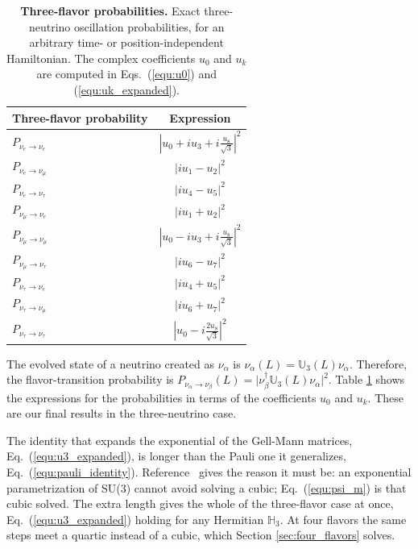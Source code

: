 \documentclass[final,5p,times,twocolumn,sort,compress]{elsarticle}
\newcommand{\eq}{Eq.}
\newcommand{\equ}[1]{\eq~(\ref{equ:#1})}
\begin{document}
{\def\arraystretch{1.3}
\begin{table}[t!]
 \begin{tabular}{lc}
  Three-flavor probability & Expression \\
  \hline
  $P_{\nu_e \to \nu_e}$        & $\left\vert u_0 + i u_3 + i \frac{u_8}{\sqrt{3}} \right\vert^2$ \\
  $P_{\nu_e \to \nu_\mu}$      & $\left\vert i u_1 - u_2 \right\vert^2$ \\
  $P_{\nu_e \to \nu_\tau}$     & $\left\vert i u_4 - u_5 \right\vert^2$ \\
  $P_{\nu_\mu \to \nu_e}$      & $\left\vert i u_1 + u_2 \right\vert^2$ \\
  $P_{\nu_\mu \to \nu_\mu}$    & $\left\vert u_0 - i u_3 + i \frac{u_8}{\sqrt{3}} \right\vert^2$ \\
  $P_{\nu_\mu \to \nu_\tau}$   & $\left\vert i u_6 - u_7 \right\vert^2$ \\
  $P_{\nu_\tau \to \nu_e}$     & $\left\vert i u_4 + u_5 \right\vert^2$ \\
  $P_{\nu_\tau \to \nu_\mu}$   & $\left\vert i u_6 + u_7 \right\vert^2$ \\
  $P_{\nu_\tau \to \nu_\tau}$  & $\left\vert u_0 - i \frac{2 u_8}{\sqrt{3}} \right\vert^2$ \\
 \end{tabular}
 \caption{\label{tab:prob_3nu}{\bf Three-flavor probabilities.} Exact three-neutrino oscillation probabilities, for an arbitrary time- or position-independent Hamiltonian.  The complex coefficients $u_0$ and $u_k$ are computed in Eqs.\ (\ref{equ:u0}) and (\ref{equ:uk_expanded}).}
\end{table}
}

The evolved state of a neutrino created as $\nu_\alpha$ is $\nu_\alpha(L) = \mathbb{U}_3(L) \nu_\alpha$.  Therefore, the flavor-transition probability is $P_{\nu_\alpha \to \nu_\beta}(L) = \lvert \nu_\beta^\dagger \mathbb{U}_3(L) \nu_\alpha \rvert^2$.   Table \ref{tab:prob_3nu} shows the expressions for the probabilities in terms of the coefficients $u_0$ and $u_k$.  These are our final results in the three-neutrino case.

The identity that expands the exponential of the Gell-Mann matrices, \equ{u3_expanded}, is longer than the Pauli one it generalizes, \equ{pauli_identity}.  Reference\ \cite{MacFarlane:1968vc} gives the reason it must be: an exponential parametrization of SU(3) cannot avoid solving a cubic; \equ{psi_m} is that cubic solved.  The extra length gives the whole of the three-flavor case at once, \equ{u3_expanded} holding for any Hermitian $\mathbb{H}_3$.  At four flavors the same steps meet a quartic instead of a cubic, which Section \ref{sec:four_flavors} solves.
\end{document}
